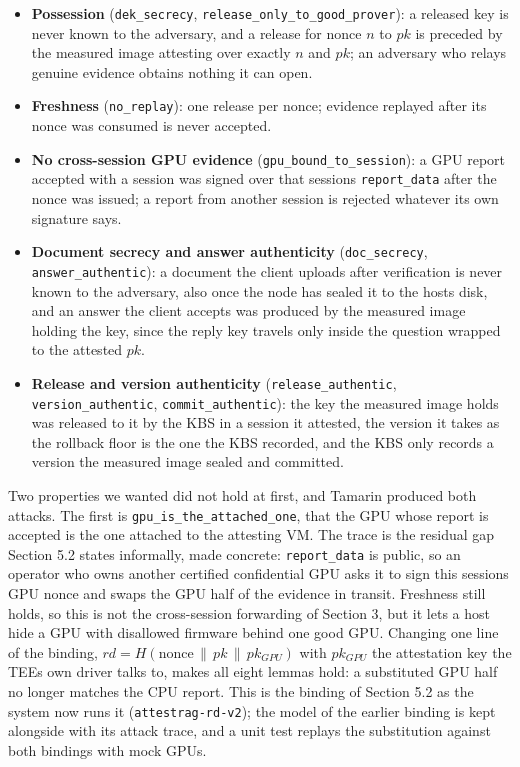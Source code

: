 \documentclass[letterpaper,twocolumn,10pt]{article}
\providecommand{\tightlist}{\setlength{\itemsep}{0pt}\setlength{\parskip}{0pt}}
\begin{document}
\begin{itemize}
\tightlist
\item
  \textbf{Possession} (\texttt{dek\_secrecy}, \texttt{release\_only\_to\_good\_prover}): a released key is never known to the adversary, and a release for nonce \(n\) to \(pk\) is preceded by the measured image attesting over exactly \(n\) and \(pk\); an adversary who relays genuine evidence obtains nothing it can open.
\item
  \textbf{Freshness} (\texttt{no\_replay}): one release per nonce; evidence replayed after its nonce was consumed is never accepted.
\item
  \textbf{No cross-session GPU evidence} (\texttt{gpu\_bound\_to\_session}): a GPU report accepted with a session was signed over that session\textquotesingle s \texttt{report\_data} after the nonce was issued; a report from another session is rejected whatever its own signature says.
\item
  \textbf{Document secrecy and answer authenticity} (\texttt{doc\_secrecy}, \texttt{answer\_authentic}): a document the client uploads after verification is never known to the adversary, also once the node has sealed it to the host\textquotesingle s disk, and an answer the client accepts was produced by the measured image holding the key, since the reply key travels only inside the question wrapped to the attested \(pk\).
\item
  \textbf{Release and version authenticity} (\texttt{release\_authentic}, \texttt{version\_authentic}, \texttt{commit\_authentic}): the key the measured image holds was released to it by the KBS in a session it attested, the version it takes as the rollback floor is the one the KBS recorded, and the KBS only records a version the measured image sealed and committed.
\end{itemize}

Two properties we wanted did not hold at first, and Tamarin produced both attacks. The first is \texttt{gpu\_is\_the\_attached\_one}, that the GPU whose report is accepted is the one attached to the attesting VM. The trace is the residual gap Section 5.2 states informally, made concrete: \texttt{report\_data} is public, so an operator who owns another certified confidential GPU asks it to sign this session\textquotesingle s GPU nonce and swaps the GPU half of the evidence in transit. Freshness still holds, so this is not the cross-session forwarding of Section 3, but it lets a host hide a GPU with disallowed firmware behind one good GPU. Changing one line of the binding, \(rd = H(\text{nonce} \,\|\, pk \,\|\, pk_{GPU})\) with \(pk_{GPU}\) the attestation key the TEE\textquotesingle s own driver talks to, makes all eight lemmas hold: a substituted GPU half no longer matches the CPU report. This is the binding of Section 5.2 as the system now runs it (\texttt{attestrag-rd-v2}); the model of the earlier binding is kept alongside with its attack trace, and a unit test replays the substitution against both bindings with mock GPUs.
\end{document}
